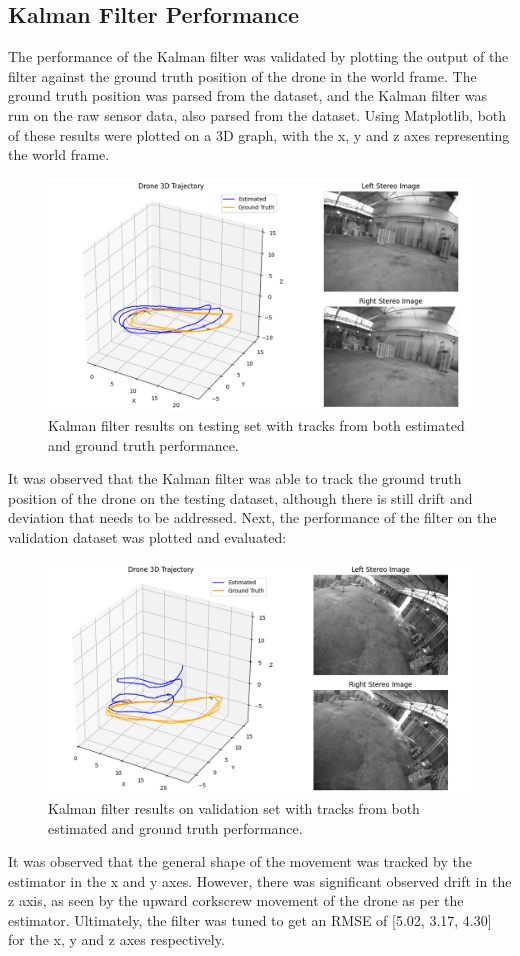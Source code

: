 \documentclass[bare_jrnl_transmag]{subfiles}
\begin{document}
\subsection{Kalman Filter Performance}
The performance of the Kalman filter was validated by plotting the output of the filter against the ground truth position of the drone in the world frame. The ground truth position was parsed from the dataset, and the Kalman filter was run on the raw sensor data, also parsed from the dataset. Using Matplotlib, both of these results were plotted on a 3D graph, with the x, y and z axes representing the world frame.

\begin{figure}[H]
    \centering
    \includegraphics[width=0.8\linewidth]{figures/kf_results.png}
    \caption{Kalman filter results on testing set with tracks from both estimated and ground truth performance.}
    \label{fig:kalman_results_test_set}
\end{figure}

It was observed that the Kalman filter was able to track the ground truth position of the drone on the testing dataset, although there is still drift and deviation that needs to be addressed. Next, the performance of the filter on the validation dataset was plotted and evaluated:

\begin{figure}[H]
    \centering
    \includegraphics[width=0.8\linewidth]{figures/kf_validation_results.png}
    \caption{Kalman filter results on validation set with tracks from both estimated and ground truth performance.}
    \label{fig:kalman_results_validation_set}
\end{figure}

It was observed that the general shape of the movement was tracked by the estimator in the x and y axes. However, there was significant observed drift in the z axis, as seen by the upward corkscrew movement of the drone as per the estimator. Ultimately, the filter was tuned to get an RMSE of [5.02, 3.17, 4.30] for the x, y and z axes respectively.
\end{document}
